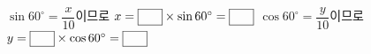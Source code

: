 \noindent\begin{minipage}[t]{0.58\linewidth}\vspace{0pt}\raggedright \end{minipage}\hfill\begin{minipage}[t]{0.4\linewidth}\vspace{0pt}\centering \resizebox{\ifdim\width>\linewidth\linewidth\else\width\fi}{!}{}\end{minipage}\par
{} $\sin 60^\circ=\dfrac{x}{10}$이므로 $x=\blank[2em]\times\sin 60^\circ=\blank[2em]$
 $\cos 60^\circ=\dfrac{y}{10}$이므로 $y=\blank[2em]\times\cos 60^\circ=\blank[2em]$
